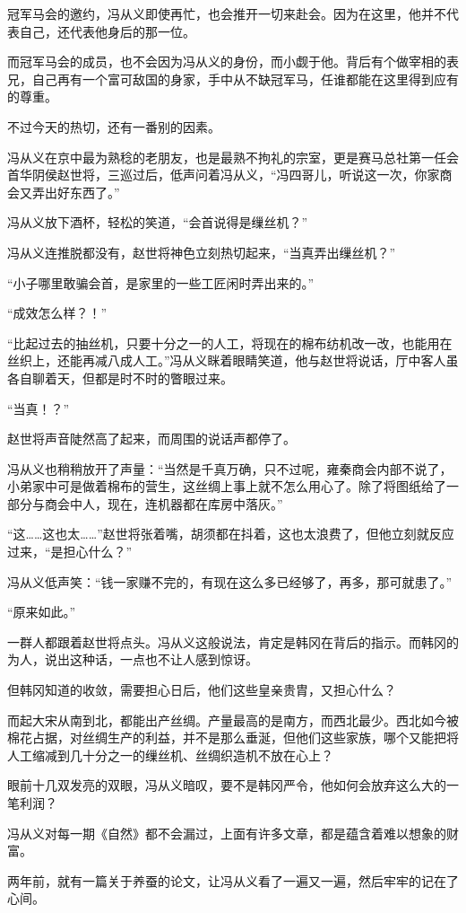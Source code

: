 冠军马会的邀约，冯从义即使再忙，也会推开一切来赴会。因为在这里，他并不代表自己，还代表他身后的那一位。

而冠军马会的成员，也不会因为冯从义的身份，而小觑于他。背后有个做宰相的表兄，自己再有一个富可敌国的身家，手中从不缺冠军马，任谁都能在这里得到应有的尊重。

不过今天的热切，还有一番别的因素。

冯从义在京中最为熟稔的老朋友，也是最熟不拘礼的宗室，更是赛马总社第一任会首华阴侯赵世将，三巡过后，低声问着冯从义，“冯四哥儿，听说这一次，你家商会又弄出好东西了。”

冯从义放下酒杯，轻松的笑道，“会首说得是缫丝机？”

冯从义连推脱都没有，赵世将神色立刻热切起来，“当真弄出缫丝机？”

“小子哪里敢骗会首，是家里的一些工匠闲时弄出来的。”

“成效怎么样？！”

“比起过去的抽丝机，只要十分之一的人工，将现在的棉布纺机改一改，也能用在丝织上，还能再减八成人工。”冯从义眯着眼睛笑道，他与赵世将说话，厅中客人虽各自聊着天，但都是时不时的瞥眼过来。

“当真！？”

赵世将声音陡然高了起来，而周围的说话声都停了。

冯从义也稍稍放开了声量：“当然是千真万确，只不过呢，雍秦商会内部不说了，小弟家中可是做着棉布的营生，这丝绸上事上就不怎么用心了。除了将图纸给了一部分与商会中人，现在，连机器都在库房中落灰。”

“这……这也太……”赵世将张着嘴，胡须都在抖着，这也太浪费了，但他立刻就反应过来，“是担心什么？”

冯从义低声笑：“钱一家赚不完的，有现在这么多已经够了，再多，那可就患了。”

“原来如此。”

一群人都跟着赵世将点头。冯从义这般说法，肯定是韩冈在背后的指示。而韩冈的为人，说出这种话，一点也不让人感到惊讶。

但韩冈知道的收敛，需要担心日后，他们这些皇亲贵胄，又担心什么？

而起大宋从南到北，都能出产丝绸。产量最高的是南方，而西北最少。西北如今被棉花占据，对丝绸生产的利益，并不是那么垂涎，但他们这些家族，哪个又能把将人工缩减到几十分之一的缫丝机、丝绸织造机不放在心上？

眼前十几双发亮的双眼，冯从义暗叹，要不是韩冈严令，他如何会放弃这么大的一笔利润？

冯从义对每一期《自然》都不会漏过，上面有许多文章，都是蕴含着难以想象的财富。

两年前，就有一篇关于养蚕的论文，让冯从义看了一遍又一遍，然后牢牢的记在了心间。

